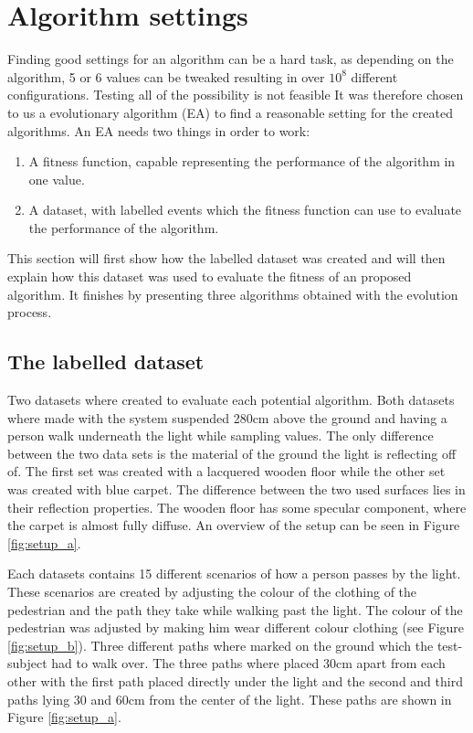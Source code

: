 \section{Algorithm settings}
Finding good settings for an algorithm can be a hard task, as depending on the algorithm, 5 or 6 values can be tweaked resulting in over $10^8$ different configurations. Testing all of the possibility is not feasible It was therefore chosen to us a evolutionary algorithm (EA) to find a reasonable setting for the created algorithms. An EA needs two things in order to work:
\begin{enumerate}[itemsep=-1ex,topsep=0pt]
	\item A fitness function, capable representing the performance of the algorithm in one value.
	\item A dataset, with labelled events which the fitness function can use to evaluate the performance of the algorithm.
\end{enumerate}
This section will first show how the labelled dataset was created and will then explain how this dataset was used to evaluate the fitness of an proposed algorithm. It finishes by presenting three algorithms obtained with the evolution process.

\subsection{The labelled dataset}
Two datasets where created to evaluate each potential algorithm. Both datasets where made with the system suspended 280cm above the ground and having a person walk underneath the light while sampling values. The only difference between the two data sets is the material of the ground the light is reflecting off of. The first set was created with a lacquered wooden floor while the other set was created with blue carpet. The difference between the two used surfaces lies in their reflection properties. The wooden floor has some specular component, where the carpet is almost fully diffuse. An overview of the setup can be seen in Figure \ref{fig:setup_a}.

Each datasets contains 15 different scenarios of how a person passes by the light. These scenarios are created by adjusting the colour of the clothing of the pedestrian and the path they take while walking past the light. The colour of the pedestrian was adjusted by making him wear different colour clothing (see Figure \ref{fig:setup_b}). Three different paths where marked on the ground which the test-subject had to walk over. The three paths where placed 30cm apart from each other with the first path placed directly under the light and the second and third paths lying 30 and 60cm from the center of the light. These paths are shown in Figure \ref{fig:setup_a}.

